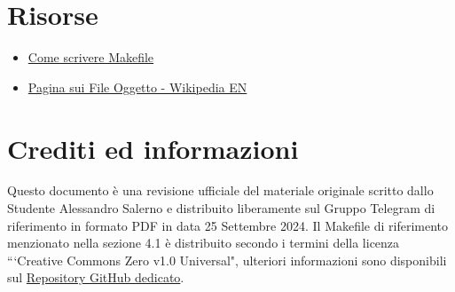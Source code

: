 \documentclass{article}
\begin{document}
\section{Risorse}
\begin{itemize}
	\item \href{https://www.corsi.univr.it/documenti/OccorrenzaIns/matdid/matdid707332.pdf}{Come scrivere Makefile}
	\item \href{https://en.wikipedia.org/wiki/Object_file}{Pagina sui File Oggetto - Wikipedia EN}
\end{itemize}

\newpage
\section{Crediti ed informazioni}
Questo documento è una revisione ufficiale del materiale originale scritto dallo Studente Alessandro Salerno e distribuito liberamente sul Gruppo Telegram di riferimento in formato PDF in data 25 Settembre 2024. Il Makefile di riferimento menzionato nella sezione 4.1 è distribuito secondo i termini della licenza ```Creative Commons Zero v1.0 Universal", ulteriori informazioni sono disponibili sul \href{https://github.com/Alessandro-Salerno/unito-makefile}{Repository GitHub dedicato}.
\end{document}
